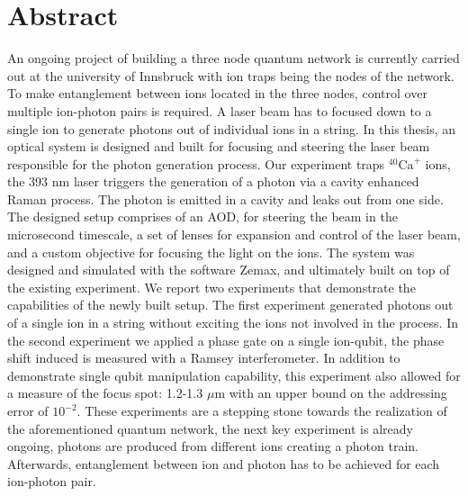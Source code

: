 \documentclass[english, a4paper, 12pt, twoside]{book}
\numberwithin{equation}{section} %
\begin{document}
{

}
\restoregeometry %

\thispagestyle{plain} %
\clearpage\mbox{}\clearpage %

\newpage

\section*{Abstract}
An ongoing project of building a three node quantum network is currently carried out at the university of Innsbruck with ion traps being the nodes of the network. To make entanglement between ions located in the three nodes, control over multiple ion-photon pairs is required. A laser beam has to focused down to a single ion to generate photons out of individual ions in a string. In this thesis, an optical system is designed and built for focusing and steering the laser beam responsible for the photon generation process. Our experiment traps $^{40}\text{Ca}^+$ ions, the 393 nm laser triggers the generation of a photon via a cavity enhanced Raman process. The photon is emitted in a cavity and leaks out from one side.
The designed setup comprises of an AOD, for steering the beam in the microsecond timescale, a set of lenses for expansion and control of the laser beam, and a custom objective for focusing the light on the ions. The system was designed and simulated with the software Zemax, and ultimately built on top of the existing experiment. We report two experiments that demonstrate the capabilities of the newly built setup. The first experiment generated photons out of a single ion in a string without exciting the ions not involved in the process. In the second experiment we applied a phase gate on a single ion-qubit, the phase shift induced is measured with a Ramsey interferometer. In addition to demonstrate single qubit manipulation capability, this experiment also allowed for a measure of the focus spot: 1.2-1.3 $\mu$m with an upper bound on the addressing error of $10^{-2}$. These experiments are a stepping stone towards the realization of the aforementioned quantum network, the next key experiment is already ongoing, photons are produced from different ions creating a photon train. Afterwards, entanglement between ion and photon has to be achieved for each ion-photon pair.
\newpage
\end{document}
